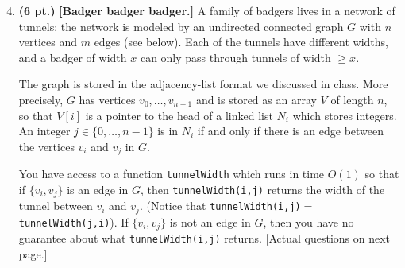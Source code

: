 \documentclass{article}
\newcommand{\pts}[1]{\textbf{(#1 pt.)}}
\begin{document}
\begin{enumerate}
\setcounter{enumi}{3}

\vspace{.5cm}
\item \pts{6} \textbf{[Badger badger badger.]}
A family of badgers lives in a network of tunnels; the network is modeled by an undirected connected graph $G$ with $n$ vertices and $m$ edges (see below).
Each of the tunnels have different widths, and a badger of width $x$ can only pass through tunnels of width $\geq x$.


\vspace{-.5cm}
\begin{center}
\end{center}

The graph is stored in the adjacency-list format we discussed in class.  More precisely, $G$ has vertices $v_0,\ldots,v_{n-1}$ and is stored as an array $V$ of length $n$, so that $V[i]$ is a pointer to the head of a linked list $N_i$ which stores integers.  An integer $j \in \{0,\ldots,n-1\}$ is in $N_i$ if and only if there is an edge between the vertices $v_i$ and $v_j$ in $G$. 

You have access to a function \texttt{tunnelWidth} which runs in time $O(1)$ so that if $\{v_i,v_j\}$ is an edge in $G$, then \texttt{tunnelWidth(i,j)} returns the width of the tunnel between $v_i$ and $v_j$.  (Notice that \texttt{tunnelWidth(i,j)}$=$\texttt{tunnelWidth(j,i)}).  If $\{v_i,v_j\}$ is not an edge in $G$, then you have no guarantee about what \texttt{tunnelWidth(i,j)} returns.
\vfill \hfill [Actual questions on next page.]
\newpage


\end{enumerate}
\end{document}
